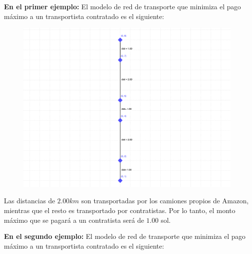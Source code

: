 \exampleCases

\begin{example}
\end{example}

\explanationText


\textbf{En el primer ejemplo:} El modelo de red de transporte que minimiza el pago máximo a un transportista contratado es el siguiente:

\begin{figure}[h]
    \centering
    \includegraphics[scale=.13]{2024/RedDeTransporte/images/ejemplo1.png}
\end{figure}

Las distancias de $2.00 km$ son transportadas por los camiones propios de Amazon, mientras que el resto es transportado por contratistas. Por lo tanto, el monto máximo que se pagará a un contratista será de $1.00$ sol.

\textbf{En el segundo ejemplo:} El modelo de red de transporte que minimiza el pago máximo a un transportista contratado es el siguiente:

